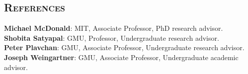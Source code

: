 \documentclass[marg, centered]{res}
\begin{document}
\begin{resume}
\section{{\scshape \bfseries References}}
\textbf{Michael McDonald}{: MIT, Associate Professor, PhD research advisor.}\\
\textbf{Shobita Satyapal}{: GMU, Professor, Undergraduate research advisor.}\\
\textbf{Peter Plavchan}{: GMU, Associate Professor, Undergraduate research advisor.}\\
\textbf{Joseph Weingartner}{: GMU,  Associate Professor, Undergraduate academic advisor.}\\

\end{resume}
\end{document}
